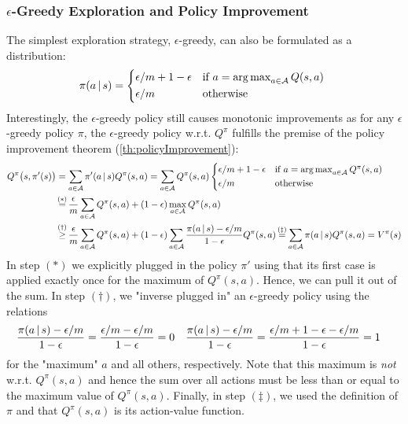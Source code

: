 			\subsubsection{\(\epsilon\)-Greedy Exploration and Policy Improvement}
				The simplest exploration strategy, \(\epsilon\)-greedy, can also be formulated as a distribution:
				\begin{equation}
					\pi(a \given s) =
					\begin{cases*}
						\epsilon/m + 1 - \epsilon & if \( a = \argmax_{a \in \mathcal{A}} Q(s, a) \) \\
						\epsilon/m                & otherwise
					\end{cases*}
				\end{equation}
				Interestingly, the \(\epsilon\)-greedy policy still causes monotonic improvements as for any \(\epsilon\)-greedy policy \(\pi\), the \(\epsilon\)-greedy policy w.r.t. \(Q^\pi\) fulfills the premise of the policy improvement theorem (\autoref{th:policyImprovement}):
				\begin{align}
					Q^\pi\bigl( s, \pi'(s) \bigr)
					 & = \sum_{a \in \mathcal{A}} \pi'(a \given s) Q^\pi(s, a)
					= \sum_{a \in \mathcal{A}} Q^\pi(s, a)
					\begin{cases*}
						\epsilon/m + 1 - \epsilon & if \( a = \argmax_{a \in \mathcal{A}} Q^\pi(s, a) \) \\
						\epsilon/m                & otherwise
					\end{cases*}                                                                                                        \\
					 & \overset{\mathclap{(\ast)}}{=} \frac{\epsilon}{m} \sum_{a \in \mathcal{A}} Q^\pi(s, a) + (1 - \epsilon) \max_{a \in \mathcal{A}} Q^\pi(s, a)                                                         \\
					 & \overset{\mathclap{(\dagger)}}{\geq} \frac{\epsilon}{m} \sum_{a \in \mathcal{A}} Q^\pi(s, a) + (1 - \epsilon) \sum_{a \in \mathcal{A}} \frac{\pi(a \given s) - \epsilon/m}{1 - \epsilon} Q^\pi(s, a)
					\overset{\mathclap{(\ddagger)}}{=} \sum_{a \in \mathcal{A}} \pi(a \given s) Q^\pi(s, a)
					= V^\pi(s)
				\end{align}
				In step \((\ast)\) we explicitly plugged in the policy \(\pi'\) using that its first case is applied exactly once for the maximum of \(Q^\pi(s, a)\). Hence, we can pull it out of the sum. In step \((\dagger)\), we "inverse plugged in" an \(\epsilon\)-greedy policy using the relations
				\begin{align}
					\frac{\pi(a \,\vert\, s) - \epsilon/m}{1 - \epsilon} & = \frac{\epsilon/m - \epsilon/m}{1 - \epsilon} = 0                &
					\frac{\pi(a \,\vert\, s) - \epsilon/m}{1 - \epsilon} & = \frac{\epsilon/m + 1 - \epsilon - \epsilon/m}{1 - \epsilon} = 1
				\end{align}
				for the "maximum" \(a\) and all others, respectively. Note that this maximum is \emph{not} w.r.t. \( Q^\pi(s, a) \) and hence the sum over all actions must be less than or equal to the maximum value of \(Q^\pi(s, a)\). Finally, in step \((\ddagger)\), we used the definition of \(\pi\) and that \(Q^\pi(s, a)\) is its action-value function.

